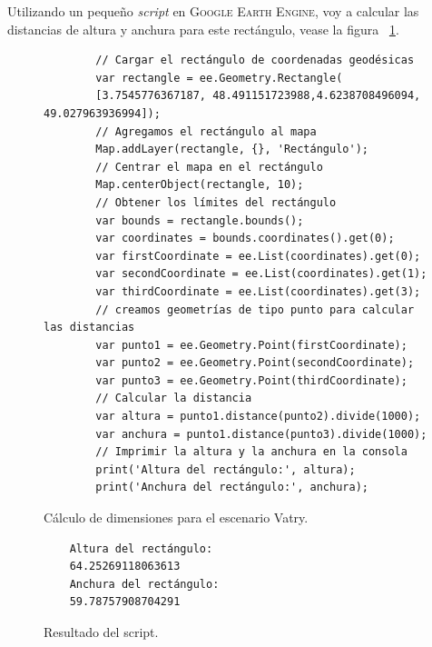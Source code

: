 \documentclass[a4paper, 11pt]{book}
\begin{document}
Utilizando un pequeño \emph{script} en \textsc{Google Earth Engine}, voy a calcular las distancias de altura y anchura para este rectángulo, vease la figura ~\ref{codigo:dimensionesVatry}.
\begin{figure}
	\centering
	\begin{verbatim}
		// Cargar el rectángulo de coordenadas geodésicas
		var rectangle = ee.Geometry.Rectangle(
		[3.7545776367187, 48.491151723988,4.6238708496094, 49.027963936994]);
		// Agregamos el rectángulo al mapa
		Map.addLayer(rectangle, {}, 'Rectángulo');
		// Centrar el mapa en el rectángulo
		Map.centerObject(rectangle, 10);
		// Obtener los límites del rectángulo
		var bounds = rectangle.bounds();
		var coordinates = bounds.coordinates().get(0);
		var firstCoordinate = ee.List(coordinates).get(0);
		var secondCoordinate = ee.List(coordinates).get(1);
		var thirdCoordinate = ee.List(coordinates).get(3);
		// creamos geometrías de tipo punto para calcular las distancias
		var punto1 = ee.Geometry.Point(firstCoordinate);
		var punto2 = ee.Geometry.Point(secondCoordinate);
		var punto3 = ee.Geometry.Point(thirdCoordinate);
		// Calcular la distancia
		var altura = punto1.distance(punto2).divide(1000);
		var anchura = punto1.distance(punto3).divide(1000);
		// Imprimir la altura y la anchura en la consola
		print('Altura del rectángulo:', altura);
		print('Anchura del rectángulo:', anchura);
	\end{verbatim}
	\caption{Cálculo de dimensiones para el escenario Vatry.
		\label{codigo:dimensionesVatry}
	}
\end{figure}
\begin{figure}
	\centering
	\begin{verbatim}
	Altura del rectángulo:
	64.25269118063613
	Anchura del rectángulo:
	59.78757908704291
	\end{verbatim}
	\caption{Resultado del script.
	\label{codigo:resultadoDimensiones}
	}
\end{figure}
\end{document}
